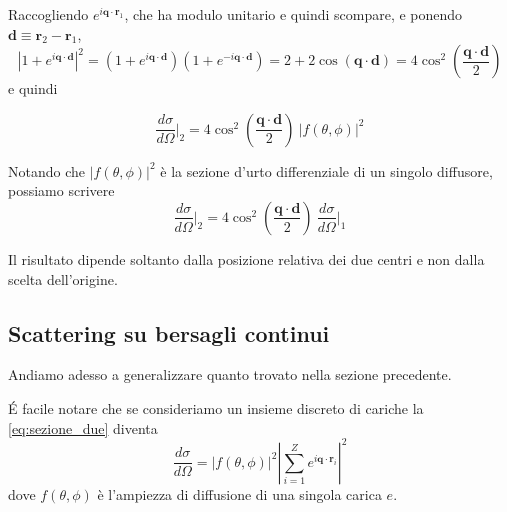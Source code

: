 Raccogliendo $e^{i\mathbf{q}\cdot\mathbf{r}_1}$, che ha modulo unitario e quindi scompare, e ponendo $\mathbf{d} \equiv \mathbf{r}_2 - \mathbf{r}_1$,
\begin{equation*}
    \left|1 + e^{i\mathbf{q}\cdot\mathbf{d}}\right|^2 = \left(1+e^{i\mathbf{q}\cdot\mathbf{d}}\right)\left(1+e^{-i\mathbf{q}\cdot\mathbf{d}}\right) = 2 + 2\cos\left(\mathbf{q}\cdot\mathbf{d}\right) = 4\cos^2\!\left(\frac{\mathbf{q}\cdot\mathbf{d}}{2}\right)
\end{equation*}
e quindi
\begin{tcolorbox}[colback=black!5!white, colframe=black!45!white, boxrule=0.8pt]
\begin{equation}
    \frac{d\sigma}{d\Omega}\bigg|_{2} = 4\cos^2\!\left(\frac{\mathbf{q}\cdot\mathbf{d}}{2}\right) \ |f(\theta,\phi)|^2
    \label{eq:interferenza_due}
\end{equation}
\end{tcolorbox}

Notando che $|f(\theta,\phi)|^2$ è la sezione d'urto differenziale di un singolo diffusore, possiamo scrivere 
\begin{equation}
    \frac{d\sigma}{d\Omega}\bigg|_{2} = 4\cos^2\!\left(\frac{\mathbf{q}\cdot\mathbf{d}}{2}\right) \ \frac{d\sigma}{d\Omega}\bigg|_{1}
\end{equation}

Il risultato dipende soltanto dalla posizione relativa dei due centri e non dalla scelta dell'origine.

\subsection{Scattering su bersagli continui}

Andiamo adesso a generalizzare quanto trovato nella sezione precedente. 

\'E facile notare che se consideriamo un insieme discreto di cariche la \eqref{eq:sezione_due} diventa 
\begin{equation}
    \frac{d\sigma}{d\Omega} = |f(\theta,\phi)|^2 \left| \sum_{i=1}^Z e^{i \mathbf{q}\cdot \mathbf{r}_i} \right|^2
    \label{eq:somma_discreta}
\end{equation}
dove $f(\theta,\phi)$ è l'ampiezza di diffusione di una singola carica $e$.

